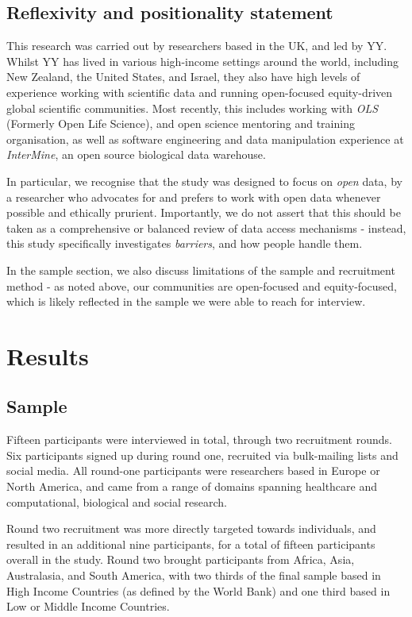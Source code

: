 \documentclass{CUP-JNL-DAP}%
\begin{document}
\subsection{Reflexivity and positionality statement} 
This research was carried out by researchers based in the UK, and led by YY. Whilst YY has lived in various high-income settings around the world, including New Zealand, the United States, and Israel, they also have high levels of experience working with scientific data and running open-focused equity-driven global scientific communities. Most recently, this includes working with \textit{OLS} (Formerly Open Life Science), and open science mentoring and training organisation, as well as software engineering and data manipulation experience at \textit{InterMine}, an open source biological data warehouse. 

In particular, we recognise that the study was designed to focus on \textit{open} data, by a researcher who advocates for and prefers to work with open data whenever possible and ethically prurient. Importantly, we do not assert that this should be taken as a comprehensive or balanced review of data access mechanisms - instead, this study specifically investigates \textit{barriers}, and how people handle them. 

In the sample section, we also discuss limitations of the sample and recruitment method - as noted above, our communities are open-focused and equity-focused, which is likely reflected in the sample we were able to reach for interview. 

\section{Results}
\subsection{Sample}
Fifteen participants were interviewed in total, through two recruitment rounds. Six participants signed up during round one, recruited via bulk-mailing lists and social media. All round-one participants were researchers based in Europe or North America, and came from a range of domains spanning healthcare and computational, biological and social research.

Round two recruitment was more directly targeted towards individuals, and resulted in an additional nine participants, for a total of fifteen participants overall in the study. Round two brought participants from Africa, Asia, Australasia, and South America, with two thirds of the final sample based in High Income Countries (as defined by the World Bank) and one third based in Low or Middle Income Countries. 
\end{document}
